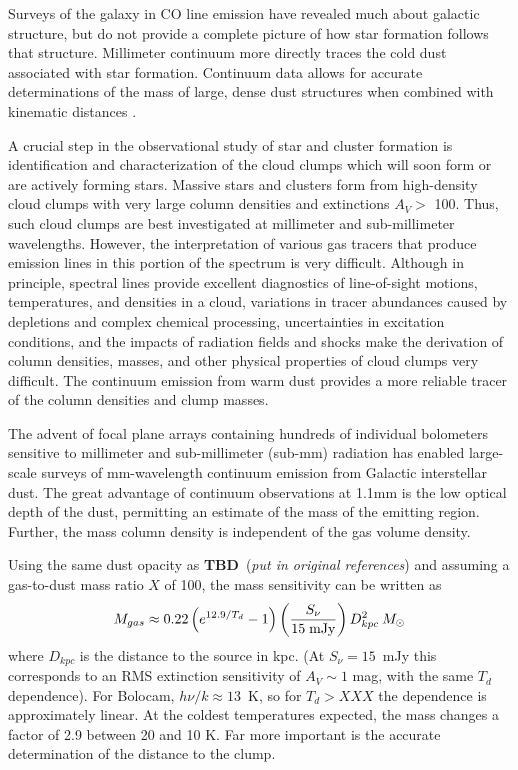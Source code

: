 \documentclass[12pt,preprint]{aastex}
\def\msol{\ifmmode {\>M_\odot}\else {$M_\odot$}\fi}
\newcommand{\TBD}{{\bf TBD}}
\begin{document}
Surveys of the galaxy in CO line emission \citep{dame01,FCRAO} have
revealed much about galactic structure, but do not provide a complete
picture of how star formation follows that structure.  Millimeter
continuum more directly traces the cold dust associated with star
formation.  Continuum data allows for accurate determinations of the
mass of large, dense dust structures when combined with kinematic
distances \citep[e.g.][]{RotationCurve}.

A crucial step in the observational study of star and cluster
formation is identification and characterization of the cloud clumps
which will soon form or are actively forming stars.  Massive stars and
clusters form from high-density cloud clumps with very large column
densities and extinctions $A_V > $ 100.  Thus, such cloud clumps are
best investigated at millimeter and sub-millimeter wavelengths.
However, the interpretation of various gas tracers that produce
emission lines in this portion of the spectrum is very difficult.
Although in principle, spectral lines provide excellent diagnostics of
line-of-sight motions, temperatures, and densities in a cloud,
variations in tracer abundances caused by depletions and complex
chemical processing, uncertainties in excitation conditions, and the
impacts of radiation fields and shocks make the derivation of column
densities, masses, and other physical properties of cloud clumps very
difficult.  The continuum emission from warm dust provides a more
reliable tracer of the column densities and clump masses.

The advent of focal plane arrays containing hundreds of individual
bolometers sensitive to millimeter and sub-millimeter (sub-mm)
radiation has enabled large-scale surveys of mm-wavelength continuum
emission from Galactic interstellar dust.  The great advantage of
continuum observations at 1.1mm is the low optical depth of the dust,
permitting an estimate of the mass of the emitting region.  Further,
the mass column density is independent of the gas volume density.

Using the same dust opacity as \TBD\ ({\it put in original references})
and assuming a gas-to-dust mass ratio $X$ of 100, the mass sensitivity
can be written as
\begin{equation} 
\label{eq:Mass}
M_{gas}\approx
0.22\left( e^{12.9/T_d}-1 \right) \left({S_\nu\over 15\; {\rm mJy}} \right)
D^{2}_{kpc} \msol 
\end{equation}
where $D_{kpc}$ is the distance to the source in kpc.  (At $S_\nu =
15$~mJy this corresponds to an RMS extinction sensitivity of $A_V\sim
1$ mag, with the same $T_d$ dependence).  For Bolocam, $h\nu/k \approx
13$~K, so for $T_d > XXX$ the dependence is approximately linear.  At
the coldest temperatures expected, the mass changes a factor of 2.9
between 20 and 10 K.  Far more important is the accurate determination
of the distance to the clump.
\end{document}
